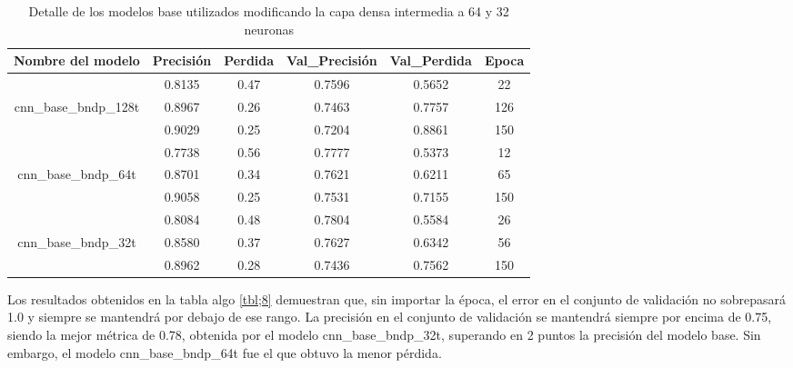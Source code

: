 \begin{table}[!ht]
	\centering
	\begin{tabular}{|c|c|c|c|c|c|}
		\hline
		\textbf{Nombre del modelo} & \textbf{Precisión} & \textbf{Perdida} & \textbf{Val\_Precisión} & \textbf{Val\_Perdida} & \textbf{Epoca} \\ \hline
		~ & 0.8135 & 0.47 & 0.7596 & 0.5652 & 22 \\ \cline{2-6}
		cnn\_base\_bndp\_128t & 0.8967 & 0.26 & 0.7463 & 0.7757 & 126 \\ \cline{2-6}
		~ & 0.9029 & 0.25 & 0.7204 & 0.8861 & 150 \\ \hline
		~ & 0.7738 & 0.56 & 0.7777 & 0.5373 & 12 \\ \cline{2-6}
		cnn\_base\_bndp\_64t & 0.8701 & 0.34 & 0.7621 & 0.6211 & 65 \\ \cline{2-6}
		~ & 0.9058 & 0.25 & 0.7531 & 0.7155 & 150 \\ \hline
		~ & 0.8084 & 0.48 & 0.7804 & 0.5584 & 26 \\ \cline{2-6}
		cnn\_base\_bndp\_32t & 0.8580 & 0.37 & 0.7627 & 0.6342 & 56 \\ \cline{2-6}
		~ & 0.8962 & 0.28 & 0.7436 & 0.7562 & 150 \\ \hline
	\end{tabular}
	\caption{Detalle de los modelos base utilizados modificando la capa densa intermedia a 64 y 32 neuronas}
	\label{tbl:8}
\end{table}

Los resultados obtenidos en la tabla algo \ref{tbl;8} demuestran que, sin importar la época, el error en el conjunto de validación no sobrepasará 1.0 y siempre se mantendrá por debajo de ese rango. La precisión en el conjunto de validación se mantendrá siempre por encima de 0.75, siendo la mejor métrica de 0.78, obtenida por el modelo cnn\_base\_bndp\_32t, superando en 2 puntos la precisión del modelo base. Sin embargo, el modelo cnn\_base\_bndp\_64t fue el que obtuvo la menor pérdida.
